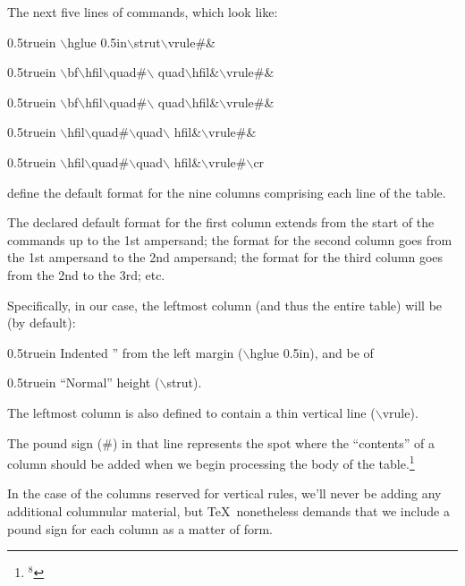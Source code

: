 \bigskip\par\noindent
The next five lines of commands, which look like:
{\twltt
\bigskip\par\noindent\hglue 0.5truein
$\backslash$hglue 0.5in$\backslash$strut$\backslash$vrule\#\&%
\par\noindent\hglue 0.5truein
$\backslash$bf$\backslash$hfil$\backslash$quad\#$\backslash$%
quad$\backslash$hfil\&$\backslash$vrule\#\&%
\par\noindent\hglue 0.5truein
$\backslash$bf$\backslash$hfil$\backslash$quad\#$\backslash$%
quad$\backslash$hfil\&$\backslash$vrule\#\&%
\par\noindent\hglue 0.5truein
$\backslash$hfil$\backslash$quad\#$\backslash$quad$\backslash$%
hfil\&$\backslash$vrule\#\&%
\par\noindent\hglue 0.5truein
$\backslash$hfil$\backslash$quad\#$\backslash$quad$\backslash$%
hfil\&$\backslash$vrule\#$\backslash$cr}
\bigskip\par\noindent
define the {\twlbf default format} for the nine columns
comprising each line of the table. 
\bigskip\par\noindent
The declared default format for the first column extends 
from the start of the commands
up to the 1st ampersand; the format for the second column goes from the 1st
ampersand to the 2nd ampersand; the format for the third column goes
from the 2nd to the 3rd; etc. 
\bigskip\par\noindent
Specifically, in our case, the leftmost
column (and thus the entire table) will be (by default):
\bigskip\par\noindent\hglue 0.5truein
Indented {}'' from the left margin ({\twltt $\backslash$hglue 0.5in}), and be of
\bigskip\par\noindent\hglue 0.5truein
``Normal'' height ({\twltt $\backslash$strut}).
\bigskip\par\noindent
The leftmost column is also defined to contain
a thin vertical line ({\twltt $\backslash$vrule}). 
\bigskip\par\noindent
The pound sign ({\twltt \#}) in that line 
represents the spot where the ``contents'' 
of a column should be added when we begin processing 
the body of the table.\footnote{$^{8}$}{In the case 
of the columns reserved for vertical rules,
we'll never be adding any additional columnular material, but \TeX\ nonetheless
demands that we include a pound sign for each column as a matter of form.
\bigskip\par\noindent}
